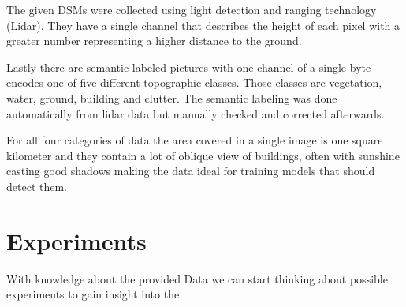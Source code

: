 The given DSMs were collected using light detection and ranging technology (Lidar). 
They have a single channel that describes the height of each pixel with a greater number 
representing a higher distance to the ground. 

Lastly there are semantic labeled pictures with one channel of a single byte encodes one of five 
different topographic classes. Those classes are vegetation, water, ground, building and clutter. 
The semantic labeling was done automatically from lidar data but manually checked and corrected afterwards.

For all four categories of data the area covered in a single image
is one square kilometer and they contain a lot of oblique view of 
buildings, often with sunshine casting good shadows making the 
data ideal for training models that should detect them.

\section{Experiments}

With knowledge about the provided Data we can start thinking about possible experiments to
gain insight into the 